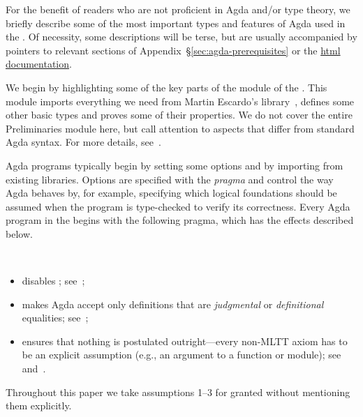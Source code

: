 For the benefit of readers who are not proficient in Agda and/or type theory, we briefly describe some of the most important types and features of Agda used in the \ualib.  Of necessity, some descriptions will be terse, but are usually accompanied by pointers to relevant sections of Appendix~\S\ref{sec:agda-prerequisites} or the \href{https://ualib.gitlab.io}{html documentation}.

We begin by highlighting some of the key parts of the \ualibPreliminaries module of the \ualib. This module imports everything we need from Martin Escardo's \typetopology library~\cite{MHE}, defines some other basic types and proves some of their properties.  We do not cover the entire Preliminaries module here, but call attention to aspects that differ from standard Agda syntax. For more details, see~\cite[\S2]{DeMeo:2021}.

Agda programs typically begin by setting some options and by importing from existing libraries.
Options are specified with the  \emph{pragma} and control the way Agda behaves by, for example, specifying which logical foundations should be assumed when the program is type-checked to verify its correctness. 
Every Agda program in the \ualib begins with the following pragma, which has the effects described below.
\ccpad
\begin{code}[number=code:options]
\>[0]\AgdaSymbol{\{-\#}\AgdaSpace{}%
\AgdaSpace{}%
\AgdaSpace{}%
\AgdaSpace{}%
\AgdaSpace{}%
\AgdaSymbol{\#-\}}\<%
\end{code}
\\[-20pt]
\begin{itemize}
\item {} disables \axiomk; see~\cite{agdaref-axiomk};
\item {} makes Agda accept only definitions that are \emph{judgmental} or \emph{definitional} equalities; see~\cite{agdatools-patternmatching};
\item {} ensures that nothing is postulated outright---every non-MLTT axiom has to be an explicit assumption (e.g., an argument to a function or module); see~\cite{agdaref-safeagda} and~\cite{agdatools-patternmatching}.
\end{itemize}
Throughout this paper we take assumptions 1--3 for granted without mentioning them explicitly.

